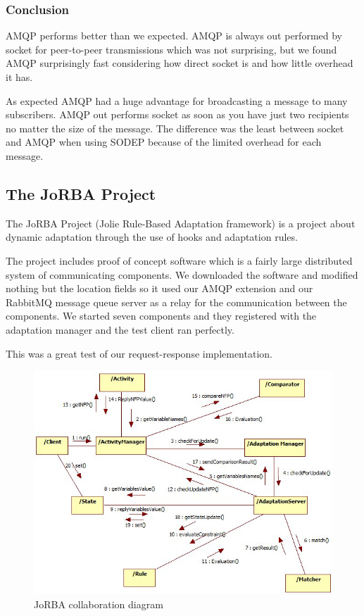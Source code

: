 \subsubsection{Conclusion}
AMQP performs better than we expected. AMQP is always out performed by socket for peer-to-peer transmissions which was not surprising, but we found AMQP surprisingly fast considering how direct socket is and how little overhead it has.

As expected AMQP had a huge advantage for broadcasting a message to many subscribers. AMQP out performs socket as soon as you have just two recipients no matter the size of the message. The difference was the least between socket and AMQP when using SODEP because of the limited overhead for each message.
\subsection{The JoRBA Project}
\label{subsec:The JoRBA Project}
The JoRBA Project\cite{Jorba} (Jolie Rule-Based Adaptation framework) is a project about dynamic adaptation through the use of hooks and adaptation rules.

The project includes proof of concept software which is a fairly large distributed system of communicating components. We downloaded the software and modified nothing but the location fields so it used our AMQP extension and our RabbitMQ message queue server as a relay for the communication between the components. We started seven components and they registered with the adaptation manager and the test client ran perfectly.

This was a great test of our request-response implementation.
\begin{figure}[H]
  \includegraphics[width=\textwidth]{illustrations/Jorba.png}
  \caption{JoRBA collaboration diagram}
\end{figure}
\newpage
